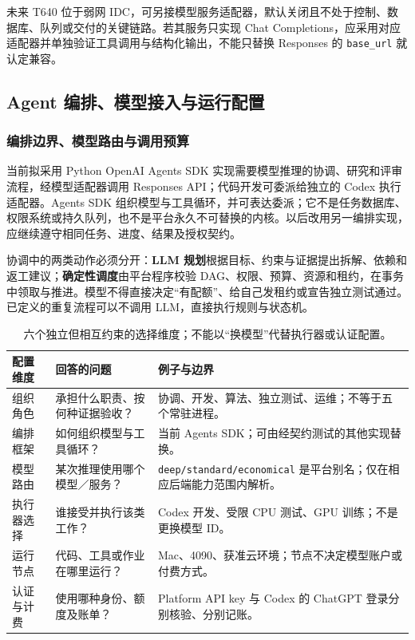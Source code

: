 \documentclass[11pt,a4paper]{article}
\begin{document}
未来 T640 位于弱网 IDC，可另接模型服务适配器，默认关闭且不处于控制、数据库、队列或交付的关键链路。若其服务只实现 Chat Completions，应采用对应适配器并单独验证工具调用与结构化输出，不能只替换 Responses 的 \texttt{base\_url} 就认定兼容。

\subsection{Agent 编排、模型接入与运行配置}
\label{sec:openai-runtime-configuration}

\subsubsection{编排边界、模型路由与调用预算}

当前拟采用 Python OpenAI Agents SDK 实现需要模型推理的协调、研究和评审流程，经模型适配器调用 Responses API；代码开发可委派给独立的 Codex 执行适配器。Agents SDK 组织模型与工具循环，并可表达委派；它不是任务数据库、权限系统或持久队列，也不是平台永久不可替换的内核。以后改用另一编排实现，应继续遵守相同任务、进度、结果及授权契约。\cite{rdRuntimeSdk}

协调中的两类动作必须分开：\textbf{LLM 规划}根据目标、约束与证据提出拆解、依赖和返工建议；\textbf{确定性调度}由平台程序校验 DAG、权限、预算、资源和租约，在事务中领取与推进。模型不得直接决定“有配额”、给自己发租约或宣告独立测试通过。已定义的重复流程可以不调用 LLM，直接执行规则与状态机。

\begin{table}[htbp]
\centering\small
\begin{tabularx}{\textwidth}{P{2.35cm}LP{5.4cm}}
\toprule\textbf{配置维度} & \textbf{回答的问题} & \textbf{例子与边界}\\\midrule
组织角色 & 承担什么职责、按何种证据验收？ & 协调、开发、算法、独立测试、运维；不等于五个常驻进程。\\
编排框架 & 如何组织模型与工具循环？ & 当前 Agents SDK；可由经契约测试的其他实现替换。\\
模型路由 & 某次推理使用哪个模型／服务？ & \texttt{deep/standard/economical} 是平台别名；仅在相应后端能力范围内解析。\\
执行器选择 & 谁接受并执行该类工作？ & Codex 开发、受限 CPU 测试、GPU 训练；不是更换模型 ID。\\
运行节点 & 代码、工具或作业在哪里运行？ & Mac、4090、获准云环境；节点不决定模型账户或付费方式。\\
认证与计费 & 使用哪种身份、额度及账单？ & Platform API key 与 Codex 的 ChatGPT 登录分别核验、分别记账。\\
\bottomrule
\end{tabularx}
\caption{六个独立但相互约束的选择维度；不能以“换模型”代替执行器或认证配置。}
\end{table}
\end{document}
